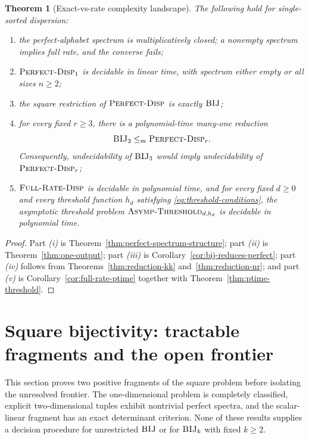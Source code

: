 \documentclass[11pt]{article}
\theoremstyle{definition}
\theoremstyle{plain}
\newtheorem{theorem}[definition]{Theorem}
\begin{document}
\begin{theorem}[Exact-vs-rate complexity landscape]
\label{thm:landscape}
The following hold for single-sorted dispersion:
\begin{enumerate}[label=\textit{(\roman*)}, leftmargin=*]
\item the perfect-alphabet spectrum is multiplicatively closed; a nonempty spectrum implies full rate, and the
      converse fails;
\item $\textsc{Perfect-Disp}_1$ is decidable in linear time, with spectrum either empty or all sizes $n\ge2$;
\item the square restriction of $\textsc{Perfect-Disp}$ is exactly $\textsc{BIJ}$;
\item for every fixed $r\ge 3$, there is a polynomial-time many-one reduction
\[
\textsc{BIJ}_3 \le_m \textsc{Perfect-Disp}_r.
\]
Consequently, undecidability of $\textsc{BIJ}_3$ would imply undecidability of
$\textsc{Perfect-Disp}_r$;
\item $\textsc{Full-Rate-Disp}$ is decidable in polynomial time, and for every fixed $d\ge 0$ and every
threshold function $h_d$ satisfying
\eqref{eq:threshold-conditions}, the asymptotic threshold problem
$\textsc{Asymp-Threshold}_{d,h_d}$ is decidable in polynomial time.
\end{enumerate}
\end{theorem}

\begin{proof}
Part \textit{(i)} is Theorem~\ref{thm:perfect-spectrum-structure}; part \textit{(ii)} is
Theorem~\ref{thm:one-output}; part \textit{(iii)} is Corollary~\ref{cor:bij-reduces-perfect}; part
\textit{(iv)} follows from Theorems~\ref{thm:reduction-kk} and~\ref{thm:reduction-nr}; and part \textit{(v)}
is Corollary~\ref{cor:full-rate-ptime} together with Theorem~\ref{thm:ptime-threshold}.
\end{proof}

\section{Square bijectivity: tractable fragments and the open frontier}
\label{sec:bij-status}

This section proves two positive fragments of the square problem before isolating the unresolved frontier.  The
one-dimensional problem is completely classified, explicit two-dimensional tuples exhibit nontrivial perfect
spectra, and the scalar-linear fragment has an exact determinant criterion.  None of these results supplies a
decision procedure for unrestricted $\textsc{BIJ}$ or for $\textsc{BIJ}_k$ with fixed $k\ge2$.
\end{document}
